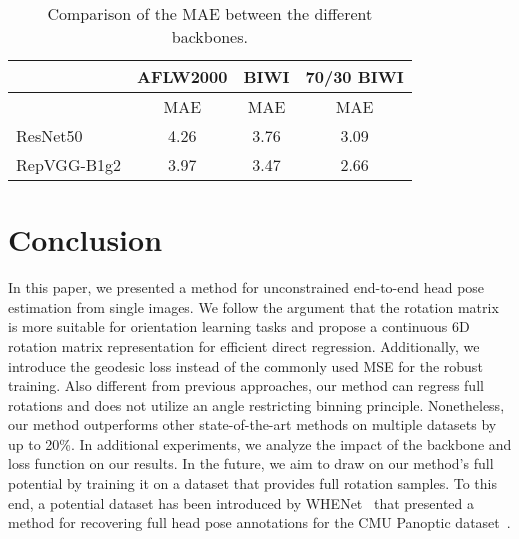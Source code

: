 \documentclass{article}
\begin{document}
\begin{table}[]
\begin{tabularx}{\linewidth} 
{    l  @{\hskip .2in}  c   c  c  }
\hline
& \textbf{AFLW2000} &\textbf{BIWI} & \textbf{70/30 BIWI}\\
\hline
& MAE  & MAE & MAE \\
  \hline
ResNet50 & 4.26 & 3.76 & 3.09\\
RepVGG-B1g2 &  3.97 & 3.47 & 2.66 \\


\hline
\end{tabularx}
\caption{Comparison of the MAE between the different backbones.}
\label{table4}
\end{table}

\section{Conclusion}
In this paper, we presented a method for unconstrained end-to-end head pose estimation from single images. We follow the argument that the rotation matrix is more suitable for orientation learning tasks and propose a continuous 6D rotation matrix representation for efficient direct regression. Additionally, we introduce the geodesic loss instead of the commonly used MSE for the robust training.
Also different from previous approaches, our method can regress full rotations and does not utilize an angle restricting binning principle. Nonetheless, our method outperforms other state-of-the-art methods on multiple datasets by up to 20\%. In additional experiments, we analyze the impact of the backbone and loss function on our results.
In the future, we aim to draw on our method's full potential by training it on a dataset that provides full rotation samples.
To this end, a potential dataset has been introduced by WHENet~\cite{Zhou2020WHENetRF} that presented a method for recovering full head pose annotations for the CMU Panoptic dataset~\cite{jooiccv2015}.














\end{document}
